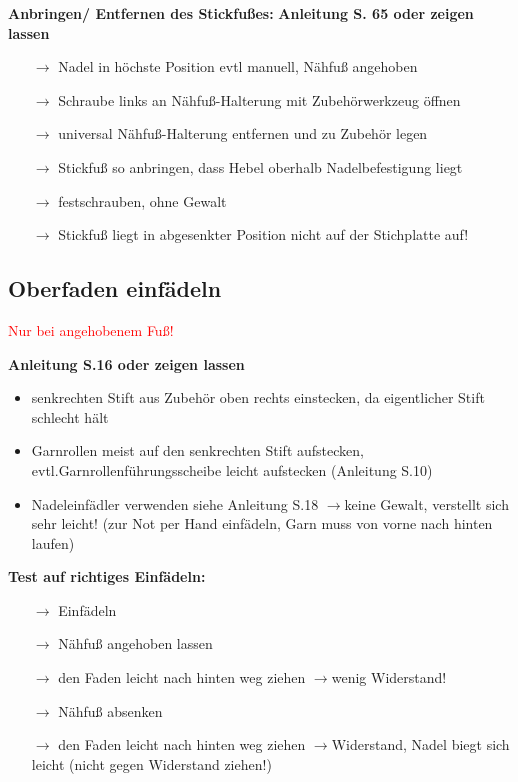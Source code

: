 \documentclass{\basedir/fablab-document}
\newcommand{\pfeil}{\ensuremath{\rightarrow}}
\begin{document}
\vspace{2em}

\textbf{Anbringen/ Entfernen des Stickfußes:}
\newline
\textbf{Anleitung S. 65 oder zeigen lassen}
\begin{itemize}
 \item[\pfeil] Nadel in höchste Position evtl manuell, Nähfuß angehoben
 \item[\pfeil] Schraube links an Nähfuß-Halterung mit Zubehörwerkzeug öffnen
 \item[\pfeil] universal Nähfuß-Halterung entfernen und zu Zubehör legen
 \item[\pfeil] Stickfuß so anbringen, dass Hebel oberhalb Nadelbefestigung liegt
 \item[\pfeil] festschrauben, ohne Gewalt
 \item[\pfeil] Stickfuß liegt in abgesenkter Position nicht auf der Stichplatte auf!
\end{itemize}

\subsection{Oberfaden einfädeln}

\textcolor{red}{Nur bei angehobenem Fuß!}

\vspace{1em}

\textbf{Anleitung S.16 oder zeigen lassen}
\begin{itemize}
 \item senkrechten Stift aus Zubehör oben rechts einstecken, da eigentlicher Stift schlecht hält
 \item Garnrollen meist auf den senkrechten Stift aufstecken, evtl.Garnrollenführungsscheibe leicht aufstecken (Anleitung S.10)
 \item Nadeleinfädler verwenden siehe Anleitung S.18 \pfeil keine Gewalt, verstellt sich sehr leicht! (zur Not per Hand einfädeln, Garn muss von vorne nach hinten laufen)
\end{itemize}

\vspace{2em}

\textbf{Test auf richtiges Einfädeln:}
\begin{itemize}
 \item[\pfeil] Einfädeln
 \item[\pfeil] Nähfuß angehoben lassen
 \item[\pfeil] den Faden leicht nach hinten weg ziehen \pfeil wenig Widerstand!
 \item[\pfeil] Nähfuß absenken
 \item[\pfeil] den Faden leicht nach hinten weg ziehen \pfeil Widerstand, Nadel biegt sich leicht (nicht gegen Widerstand ziehen!)
\end{itemize}
\end{document}
